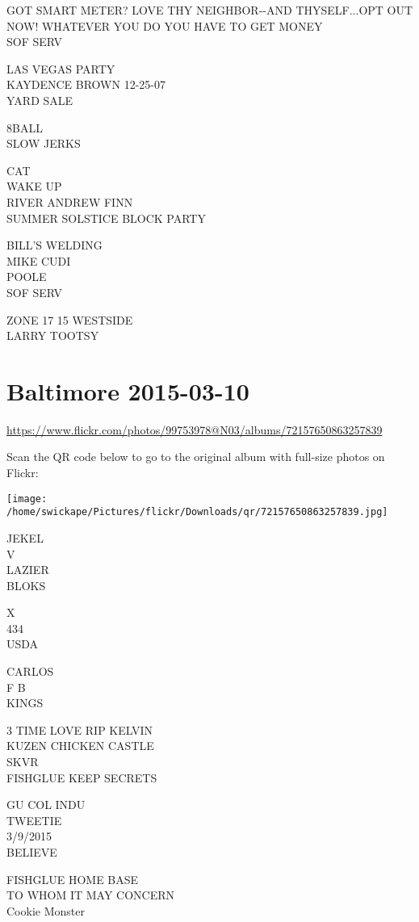 \documentclass[10pt,letterpaper]{article}
\begin{document}
GOT SMART METER? LOVE THY NEIGHBOR{-}{-}AND THYSELF...OPT OUT NOW!  WHATEVER YOU DO YOU HAVE TO GET MONEY\\
SOF SERV

LAS VEGAS PARTY\\
KAYDENCE BROWN 12{-}25{-}07\\
YARD SALE

8BALL\\
SLOW JERKS

CAT\\
WAKE UP\\
RIVER ANDREW FINN\\
SUMMER SOLSTICE BLOCK PARTY

BILL'S WELDING\\
MIKE CUDI\\
POOLE\\
SOF SERV

ZONE 17 15 WESTSIDE\\
LARRY TOOTSY
\pagebreak

\section*{Baltimore 2015-03-10}

\url{https://www.flickr.com/photos/99753978@N03/albums/72157650863257839}

Scan the QR code below to go to the original album with full-size photos on Flickr:

\texttt{[image: /home/swickape/Pictures/flickr/Downloads/qr/72157650863257839.jpg]}
\pagebreak

JEKEL\\
V\\
LAZIER\\
BLOKS

X\\
434\\
USDA

CARLOS\\
F B\\
KINGS

3 TIME LOVE RIP KELVIN\\
KUZEN CHICKEN CASTLE\\
SKVR\\
FISHGLUE KEEP SECRETS

GU COL INDU\\
TWEETIE\\
3/9/2015\\
BELIEVE

FISHGLUE HOME BASE\\
TO WHOM IT MAY CONCERN\\
Cookie Monster
\end{document}
